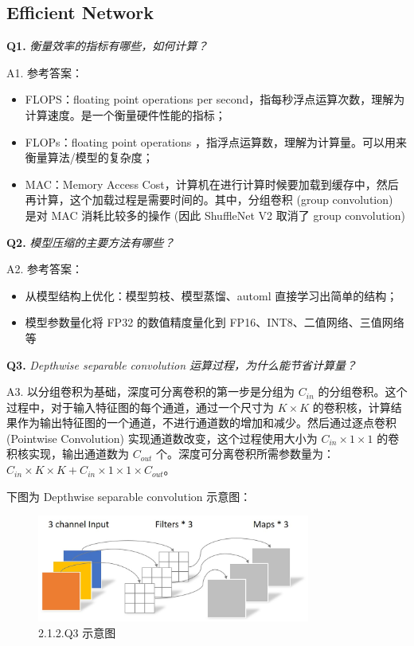 \documentclass[cn,10pt,math=newtx,citestyle=gb7714-2015,bibstyle=gb7714-2015]{elegantbook}
\begin{document}
\subsection{Efficient Network}

\textbf{Q1.} \textit{衡量效率的指标有哪些，如何计算？}

A1. 参考答案：
\begin{itemize}
  \item FLOPS：floating point operations per second，指每秒浮点运算次数，理解为计算速度。是一个衡量硬件性能的指标；
  \item FLOPs：floating point operations ，指浮点运算数，理解为计算量。可以用来衡量算法/模型的复杂度；
  \item MAC：Memory Access Cost，计算机在进行计算时候要加载到缓存中，然后再计算，这个加载过程是需要时间的。其中，分组卷积 (group convolution) 是对 MAC 消耗比较多的操作 (因此 ShuffleNet V2 取消了 group convolution)\\
\end{itemize}


\textbf{Q2.} \textit{模型压缩的主要方法有哪些？}

A2. 参考答案：

\begin{itemize}
  \item 从模型结构上优化：模型剪枝、模型蒸馏、automl 直接学习出简单的结构；
  \item 模型参数量化将 FP32 的数值精度量化到 FP16、INT8、二值网络、三值网络等\\
\end{itemize}


\textbf{Q3.} \textit{Depthwise separable convolution 运算过程，为什么能节省计算量？}

A3. 以分组卷积为基础，深度可分离卷积的第一步是分组为 $C_{in}$ 的分组卷积。这个过程中，对于输入特征图的每个通道，通过一个尺寸为 $K\times{K}$ 的卷积核，计算结果作为输出特征图的一个通道，不进行通道数的增加和减少。然后通过逐点卷积 (Pointwise Convolution) 实现通道数改变，这个过程使用大小为 $C_{in} \times {1} \times {1}$ 的卷积核实现，输出通道数为 $C_{out}$ 个。深度可分离卷积所需参数量为：$C_{in}\times{K}\times{K}+C_{in}\times{1}\times{1}\times{C_{out}}$。

下图为 Depthwise separable convolution 示意图：

\begin{figure}[ht]
  \centering
  \includegraphics[width=0.8\textwidth]{image/2.1.2.q3.jpeg}
  \caption{2.1.2.Q3 示意图}
\end{figure}
\end{document}

